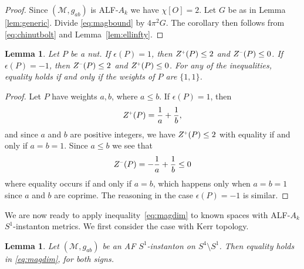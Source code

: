 \documentclass[a4paper,10pt,reqno]{amsart}
\newcommand{\nut}{P}
\newcommand{\cM}{\mathcal{M}}
\theoremstyle{plain}
\newtheorem{lemma}[thm]{Lemma}
\renewcommand{\P}[1]{{{#1}^{\hspace{-.5pt}\scaleto{+}{4pt}}}}
\newcommand{\M}[1]{{{#1}^{\hspace{-.5pt}\scaleto{-}{4pt}}}}
\numberwithin{equation}{section}
\begin{document}
\begin{proof} 
Since $(\cM, g_{ab})$ is ALF-$A_k$ we have $\chi[O] = 2$. Let $G$ be as in Lemma \ref{lem:generic}. Divide \eqref{eq:magbound} by $4\pi^2 G$. The corollary then follows from \eqref{eq:chinutbolt} and Lemma~\ref{lem:ellinfty}.
\end{proof} 

\begin{lemma}\label{lem:Zpm-est} 
Let $\nut$ be a nut. If $\epsilon(\nut)=1$, then $\P{Z}(\nut)\leq2$ and $\M{Z}(\nut)\leq 0$. If $\epsilon(\nut)=-1$, then $\M{Z}(\nut)\leq 2$ and $\P{Z}(\nut)\leq 0$. For any of the inequalities, equality holds if and only if the weights of $\nut$ are $\{1,1\}$.
\end{lemma}

\begin{proof}
Let $\nut$ have weights $a,b$, where $a\leq b$. If $\epsilon(\nut)=1$, then 
\begin{align}
\P{Z}(\nut)=\frac{1}{a}+\frac{1}{b},
\end{align} 
and since $a$ and $b$ are positive integers, we have $\P{Z}(\nut)\leq 2$ with equality if and only if $a=b=1$. Since $a\leq b$ we see that 
\begin{align}
\M{Z}(\nut)=-\frac{1}{a}+\frac{1}{b}\leq 0
\end{align} 
where equality occurs if and only if $a=b$, which happens only when  $a=b=1$ since $a$ and $b$ are coprime. The reasoning in the case $\epsilon(\nut)=-1$ is similar.
\end{proof}

We are now ready to apply inequality~\eqref{eq:magdim} to known spaces with ALF-$A_k$ $S^1$-instanton metrics. We first consider the case with Kerr topology. 

\begin{lemma} \label{lem:Kerr-eq}
Let $(\cM,g_{ab})$ be an AF $S^1$-instanton on $S^4 \setminus S^1$. Then equality holds in \eqref{eq:magdim}, for both signs. 
\end{lemma}
\end{document}
